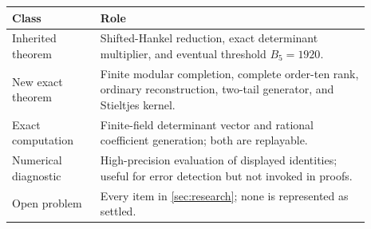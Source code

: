\documentclass[11pt]{article}
\theoremstyle{definition}
\begin{document}
\begin{center}
\begin{tabular}{p{0.22\linewidth}p{0.67\linewidth}}
\toprule
Class&Role\\
\midrule
Inherited theorem&Shifted-Hankel reduction, exact determinant multiplier,
and eventual threshold $B_5=1920$.\\
New exact theorem&Finite modular completion, complete order-ten rank,
ordinary reconstruction, two-tail generator, and Stieltjes kernel.\\
Exact computation&Finite-field determinant vector and rational
coefficient generation; both are replayable.\\
Numerical diagnostic&High-precision evaluation of displayed identities;
useful for error detection but not invoked in proofs.\\
Open problem&Every item in \cref{sec:research}; none is represented as
settled.\\
\bottomrule
\end{tabular}
\end{center}
\end{document}
